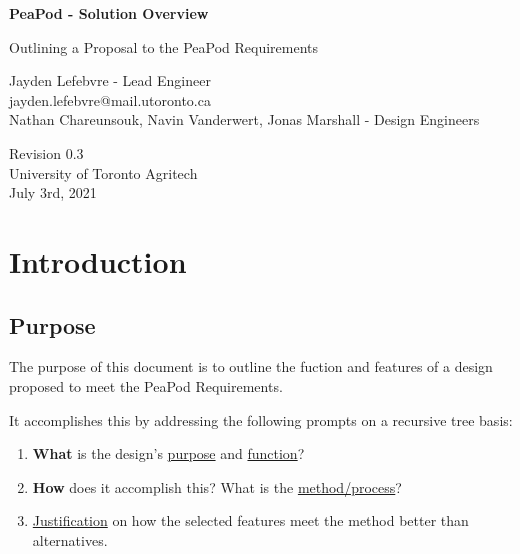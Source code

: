 \documentclass{report}
\begin{document}
\begin{titlepage}
    \begin{center}
        \vspace*{1.2cm}

        \textbf{\large{PeaPod - Solution Overview}}

        \vspace{0.5cm}

        Outlining a Proposal to the PeaPod Requirements

        \vfill

        Jayden Lefebvre - Lead Engineer\\\small{jayden.lefebvre@mail.utoronto.ca}\\
        \vspace{1cm}
        Nathan Chareunsouk, Navin Vanderwert, Jonas Marshall - Design Engineers

        \vspace{2.5cm}

        Revision 0.3\\
        University of Toronto Agritech\\
        July 3rd, 2021

    \end{center}
\end{titlepage}

\thispagestyle{plain}

\tableofcontents
\newpage

\section{Introduction}
\label{sec:intro}

\subsection{Purpose}
\label{sec:purpose}

The purpose of this document is to outline the fuction and features of a design proposed to meet the PeaPod Requirements.

It accomplishes this by addressing the following prompts on a recursive tree basis:
\begin{enumerate}
    \item \textbf{What} is the design's \uline{purpose} and \uline{function}?
    \item \textbf{How} does it accomplish this? What is the \uline{method/process}?
    \item \uline{Justification} on how the selected features meet the method better than alternatives.
\end{enumerate}
\end{document}
